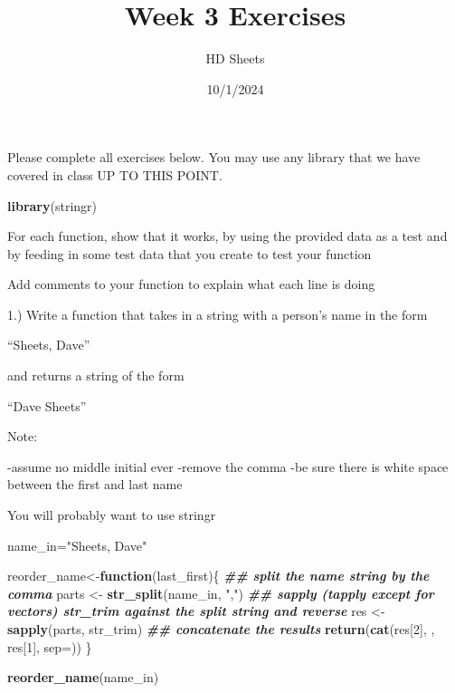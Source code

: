 \documentclass[
]{article}
\title{Week 3 Exercises}
\author{HD Sheets}
\date{10/1/2024}
\newenvironment{Shaded}{\begin{snugshade}}{\end{snugshade}}
\newcommand{\AttributeTok}[1]{\textcolor[rgb]{0.13,0.29,0.53}{#1}}
\newcommand{\ControlFlowTok}[1]{\textcolor[rgb]{0.13,0.29,0.53}{\textbf{#1}}}
\newcommand{\DecValTok}[1]{\textcolor[rgb]{0.00,0.00,0.81}{#1}}
\newcommand{\DocumentationTok}[1]{\textcolor[rgb]{0.56,0.35,0.01}{\textbf{\textit{#1}}}}
\newcommand{\FunctionTok}[1]{\textcolor[rgb]{0.13,0.29,0.53}{\textbf{#1}}}
\newcommand{\NormalTok}[1]{#1}
\newcommand{\OtherTok}[1]{\textcolor[rgb]{0.56,0.35,0.01}{#1}}
\newcommand{\StringTok}[1]{\textcolor[rgb]{0.31,0.60,0.02}{#1}}
\begin{document}
\maketitle

Please complete all exercises below. You may use any library that we
have covered in class UP TO THIS POINT.

\begin{Shaded}
\begin{Highlighting}[]
\FunctionTok{library}\NormalTok{(stringr)}
\end{Highlighting}
\end{Shaded}

For each function, show that it works, by using the provided data as a
test and by feeding in some test data that you create to test your
function

Add comments to your function to explain what each line is doing

1.) Write a function that takes in a string with a person's name in the
form

``Sheets, Dave''

and returns a string of the form

``Dave Sheets''

Note:

-assume no middle initial ever -remove the comma -be sure there is white
space between the first and last name

You will probably want to use stringr

\begin{Shaded}
\begin{Highlighting}[]
\NormalTok{name\_in}\OtherTok{=}\StringTok{"Sheets, Dave"}

\NormalTok{reorder\_name}\OtherTok{\textless{}{-}}\ControlFlowTok{function}\NormalTok{(last\_first)\{}
  \DocumentationTok{\#\# split the name string by the comma}
\NormalTok{  parts }\OtherTok{\textless{}{-}} \FunctionTok{str\_split}\NormalTok{(name\_in, }\StringTok{","}\NormalTok{)}
  \DocumentationTok{\#\# sapply (tapply except for vectors) str\_trim against the split string and reverse}
\NormalTok{  res }\OtherTok{\textless{}{-}} \FunctionTok{sapply}\NormalTok{(parts, str\_trim)}
  \DocumentationTok{\#\# concatenate the results}
  \FunctionTok{return}\NormalTok{(}\FunctionTok{cat}\NormalTok{(res[}\DecValTok{2}\NormalTok{], }\StringTok{\textquotesingle{} \textquotesingle{}}\NormalTok{, res[}\DecValTok{1}\NormalTok{], }\AttributeTok{sep=}\StringTok{\textquotesingle{}\textquotesingle{}}\NormalTok{))}
\NormalTok{\}}

\FunctionTok{reorder\_name}\NormalTok{(name\_in)}
\end{Highlighting}
\end{Shaded}
\end{document}
